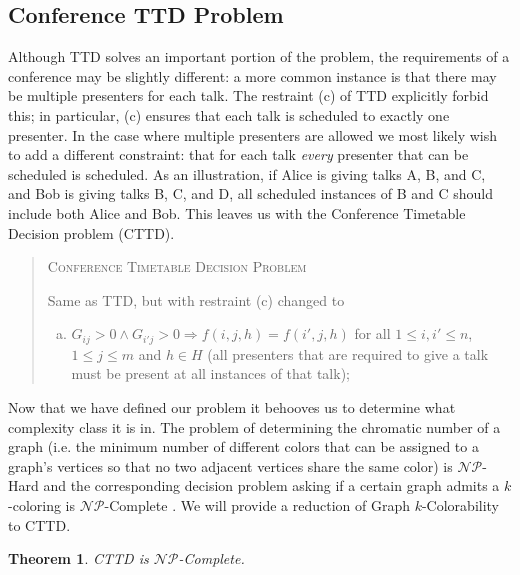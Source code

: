 \documentclass[]{article}
\newtheorem{thm}{Theorem}[section]
\theoremstyle{definition}
\theoremstyle{remark}
\numberwithin{equation}{section}
\newcommand{\cNP}{$\mathcal{NP}$}
\begin{document}
\subsection{Conference TTD Problem}
Although TTD solves an important portion of the problem, the requirements of a conference may be slightly different: a more common instance is that there may be multiple presenters for each talk. The restraint (c) of TTD explicitly forbid this; in particular, (c) ensures that each talk is scheduled to exactly one presenter. In the case where multiple presenters are allowed we most likely wish to add a different constraint: that for each talk \emph{every} presenter that can be scheduled is scheduled. As an illustration, if Alice is giving talks A, B, and C, and Bob is giving talks B, C, and D, all scheduled instances of B and C should include both Alice and Bob. This leaves us with the Conference Timetable Decision problem (CTTD).
\begin{quote}
	\textsc{Conference Timetable Decision Problem}
	
	Same as TTD, but with restraint (c) changed to
	\begin{enumerate}[(c)]
		\item $G_{ij} > 0 \land G_{i'j} > 0 \Rightarrow f(i,j,h)=f(i',j,h)$ for all $1 \le i,i' \le n$, $1 \le j \le m$ and $h \in H$ (all presenters that are required to give a talk must be present at all instances of that talk);
	\end{enumerate}
\end{quote}
Now that we have defined our problem it behooves us to determine what complexity class it is in. The problem of determining the chromatic number of a graph (i.e. the minimum number of different colors that can be assigned to a graph's vertices so that no two adjacent vertices share the same color) is \cNP-Hard and the corresponding decision problem asking if a certain graph admits a $k$-coloring is \cNP-Complete \cite{garey76_2}. We will provide a reduction of Graph $k$-Colorability to CTTD.
\begin{thm}
	CTTD is \cNP-Complete.
\end{thm}
\end{document}

